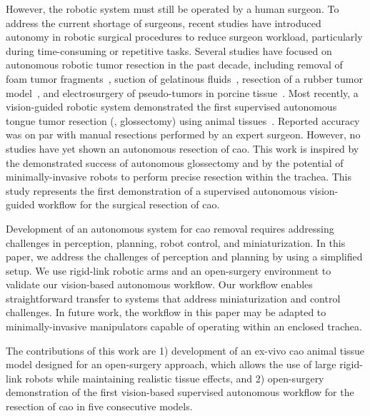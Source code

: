 However, the robotic system must still be operated by a human surgeon. To address the current shortage of surgeons, recent studies have introduced autonomy in robotic surgical procedures to reduce surgeon workload, particularly during time-consuming or repetitive tasks. Several studies have focused on autonomous robotic tumor resection in the past decade, including removal of foam tumor fragments~\cite{Kehoe2014}, suction of gelatinous fluids~\cite{Hu2018}, resection of a rubber tumor model~\cite{McKinley2016}, and electrosurgery of pseudo-tumors in porcine tissue~\cite{Opfermann2017}. Most recently, a vision-guided robotic system demonstrated the first supervised autonomous tongue tumor resection (\ie, glossectomy) using animal tissues~\cite{Ge2019, Ge2021, Ge2024}. Reported accuracy was on par with manual resections performed by an expert surgeon. However, no studies have yet shown an autonomous resection of \gls{cao}. This work is inspired by the demonstrated success of autonomous glossectomy and by the potential of minimally-invasive robots to perform precise resection within the trachea. This study represents the first demonstration of a supervised autonomous vision-guided workflow for the surgical resection of \gls{cao}.


Development of an autonomous system for \gls{cao} removal requires addressing challenges in perception, planning, robot control, and miniaturization. In this paper, we address the challenges of perception and planning by using a simplified setup. We use rigid-link robotic arms and an open-surgery environment to validate our vision-based autonomous workflow. Our workflow enables straightforward transfer to systems that address miniaturization and control challenges. In future work, the workflow in this paper may be adapted to minimally-invasive manipulators capable of operating within an enclosed trachea.


The contributions of this work are
1) development of an ex-vivo \gls{cao} animal tissue model designed for an open-surgery approach, which allows the use of large rigid-link robots while maintaining realistic tissue effects, and
2) open-surgery demonstration of the first vision-based supervised autonomous workflow for the resection of \gls{cao} in five consecutive models.

 







